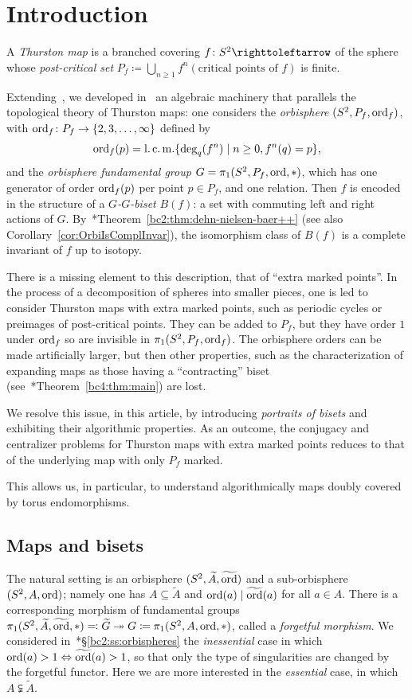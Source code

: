 \documentclass{amsart}
\newcommand\wtA{{\widetilde A}}
\newcommand\wtG{{\widetilde G}}
\newcommand\wtord{{\widetilde\ord}}
\begin{document}
\section{Introduction}
A \emph{Thurston map} is a branched covering $f\colon S^2\selfmap$ of
the sphere whose \emph{post-critical set}
$P_f\coloneqq\bigcup_{n\ge1}f^n(\text{critical points of }f)$ is
finite.

Extending~\cite{nekrashevych:ssg}, we developed
in~\cites{bartholdi-dudko:bc0,bartholdi-dudko:bc1,bartholdi-dudko:bc2,bartholdi-dudko:bc4}
an algebraic machinery that parallels the topological theory of
Thurston maps: one considers the \emph{orbisphere} $(S^2,P_f,\operatorname{ord}_f)$,
with $\operatorname{ord}_f\colon P_f\to\{2,3,\dots,\infty\}$ defined by
\[\operatorname{ord}_f(p)=\operatorname{l.c.m.}\{\deg_q(f^n)\mid n\ge0, f^n(q)=p\},
\]
and the \emph{orbisphere fundamental group} $G=\pi_1(S^2,P_f,\operatorname{ord},*)$,
which has one generator of order $\operatorname{ord}_f(p)$ per point $p\in P_f$, and
one relation. Then $f$ is encoded in the structure of a
\emph{$G$-$G$-biset} $B(f)$: a set with commuting left and right
actions of
$G$. By~\cite{bartholdi-dudko:bc2}*{Theorem~\ref{bc2:thm:dehn-nielsen-baer++}}
(see also Corollary~\ref{cor:OrbiIsComplInvar}), the isomorphism class
of $B(f)$ is a complete invariant of $f$ up to isotopy.

There is a missing element to this description, that of ``extra marked
points''. In the process of a decomposition of spheres into smaller
pieces, one is led to consider Thurston maps with extra marked points,
such as periodic cycles or preimages of post-critical points. They can
be added to $P_f$, but they have order $1$ under $\operatorname{ord}_f$ so are
invisible in $\pi_1(S^2,P_f,\operatorname{ord}_f)$. The orbisphere orders can be
made artificially larger, but then other properties, such as the
characterization of expanding maps as those having a ``contracting''
biset (see~\cite{bartholdi-dudko:bc4}*{Theorem~\ref{bc4:thm:main}})
are lost.

We resolve this issue, in this article, by introducing \emph{portraits
  of bisets} and exhibiting their algorithmic properties. As an
outcome, the conjugacy and centralizer problems for Thurston maps with
extra marked points reduces to that of the underlying map with only
$P_f$ marked.

This allows us, in particular, to understand algorithmically maps
doubly covered by torus endomorphisms.

\subsection{Maps and bisets}
The natural setting is an orbisphere $(S^2,\wtA,\wtord)$ and a
sub-orbisphere $(S^2,A,\operatorname{ord})$; namely one has $A\subseteq\wtA$ and
$\ord(a)\mid\wtord(a)$ for all $a\in A$. There is a
corresponding morphism of fundamental groups
$\pi_1(S^2,\wtA,\wtord,*)\eqqcolon\wtG\twoheadrightarrow
G\coloneqq\pi_1(S^2,A,\ord,*)$, called a \emph{forgetful morphism}. We
considered in~\cite{bartholdi-dudko:bc2}*{\S\ref{bc2:ss:orbispheres}}
the \emph{inessential} case in which
$\ord(a)>1\Leftrightarrow\wtord(a)>1$, so that only the type
of singularities are changed by the forgetful functor.  Here we are
more interested in the \emph{essential} case, in which
$A\subsetneqq\wtA$.
\end{document}
